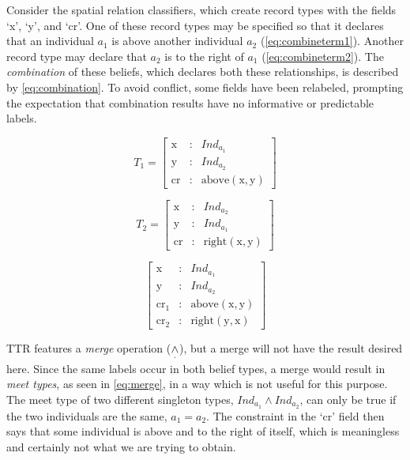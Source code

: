 Consider the spatial relation classifiers, which create record types with the fields `x', `y', and `cr'.
One of these record types may be specified so that it declares that an individual $a_1$ is above another individual $a_2$ (\autoref{eq:combineterm1}).
Another record type may declare that $a_2$ is to the right of $a_1$ (\autoref{eq:combineterm2}).
The \textit{combination} of these beliefs, which declares both these relationships, is described by \autoref{eq:combination}.
To avoid conflict, some fields have been relabeled, prompting the expectation that combination results have no informative or predictable labels.

\begin{equation} \label{eq:combineterm1}
T_1 = \left[\begin{array}{rcl}
    \text{x} &:& Ind_{a_1} \\
    \text{y} &:& Ind_{a_2} \\
    \text{cr} &:& \text{above}(\text{x}, \text{y})
    \end{array}\right]
\end{equation}

\begin{equation} \label{eq:combineterm2}
T_2 = \left[\begin{array}{rcl}
    \text{x} &:& Ind_{a_2} \\
    \text{y} &:& Ind_{a_1} \\
    \text{cr} &:& \text{right}(\text{x}, \text{y})
    \end{array}\right]
\end{equation}

\begin{equation} \label{eq:combination}
\left[\begin{array}{rcl}
    \text{x} &:& Ind_{a_1} \\
    \text{y} &:& Ind_{a_2} \\
    \text{cr}_1 &:& \text{above}(\text{x}, \text{y}) \\
    \text{cr}_2 &:& \text{right}(\text{y}, \text{x})
    \end{array}\right]
\end{equation}

TTR features a \textit{merge} operation ($\mathrel{\underset\cdot\wedge}$), but a merge will not have the result desired here.
Since the same labels occur in both belief types, a merge would result in \textit{meet types}, as seen in \autoref{eq:merge}, in a way which is not useful for this purpose.
The meet type of two different singleton types, $Ind_{a_1} \wedge Ind_{a_2}$, can only be true if the two individuals are the same, $a_1 = a_2$.
The constraint in the `cr' field then says that some individual is above and to the right of itself, which is meaningless and certainly not what we are trying to obtain.

